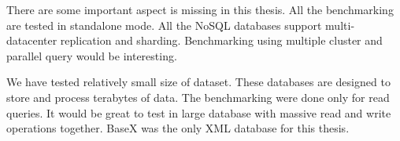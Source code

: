 There are some important aspect is missing in this thesis. All the benchmarking are tested in standalone mode. All the NoSQL databases support multi-datacenter replication and sharding. Benchmarking using multiple cluster and parallel query would be interesting. 

We have tested relatively small size of dataset. These databases are designed to store and process terabytes of data. The benchmarking were done only for read queries. It would be great to test in large database with massive read and write operations together. BaseX was the only XML database for this thesis. 